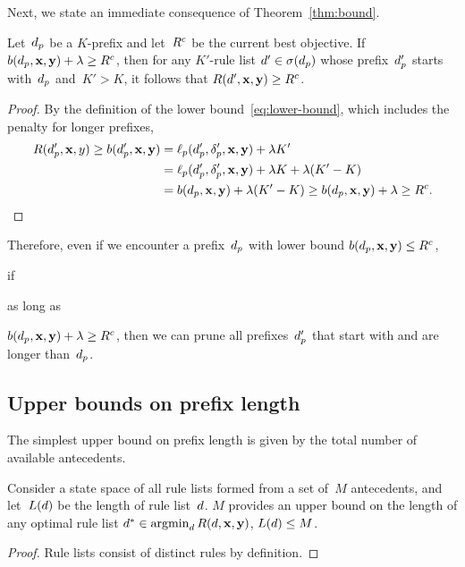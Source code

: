 Next, we state an immediate consequence of Theorem~\ref{thm:bound}.

\begin{lemma}
\label{lemma:lookahead}
Let~$d_p$ be a $K$-prefix
and let~${R^c}$ be the current best objective.
%
If ${b(d_p, \mathbf{x}, \mathbf{y}) + {\lambda} \ge {R^c}}$,
then for any $K'$-rule list ${{d}' \in \sigma(d_p)}$
whose prefix~$d_p'$ starts with~$d_p$ and~${K' > K}$,
it follows that ${R({d}', \mathbf{x}, \mathbf{y}) \ge {R^c}}$.
\end{lemma}

\begin{arxiv}
\begin{proof}
By the definition of the lower bound~\eqref{eq:lower-bound},
which includes the penalty for longer prefixes,
\begin{align}
R(d_p', \mathbf{x}, y) \ge b(d_p', \mathbf{x}, \mathbf{y}) &= \ell_p(d_p', \delta_p', \mathbf{x}, \mathbf{y}) + {\lambda} K' \nonumber \\
&= \ell_p(d_p', \delta_p', \mathbf{x}, \mathbf{y}) + {\lambda} K + {\lambda} (K' - K) \nonumber \\
&= b(d_p, \mathbf{x}, \mathbf{y}) + {\lambda} (K' - K)
\ge b(d_p, \mathbf{x}, \mathbf{y}) + {\lambda} \ge {R^c}.
\label{eq:lookahead}
\end{align}
\end{proof}
\end{arxiv}

Therefore, even if we encounter a prefix~$d_p$
with lower bound ${b(d_p, \mathbf{x}, \mathbf{y}) \le {R^c}}$,
\begin{kdd}
if
\end{kdd}
\begin{arxiv}
as long as
\end{arxiv}
${b(d_p, \mathbf{x}, \mathbf{y}) + {\lambda} \ge {R^c}}$, then we can prune
all prefixes~$d_p'$ that start with and are longer than~$d_p$.

\subsection{Upper bounds on prefix length}
\label{sec:ub-prefix-length}

\begin{arxiv}
The simplest upper bound on prefix length is given by the total
number of available antecedents.

\begin{proposition}
\label{prop:trivial-length}
Consider a state space of all rule lists formed from
a set of~$M$ antecedents,
and let~$L({d})$ be the length of rule list~${d}$.
%
$M$ provides an upper bound on the length of
any optimal rule list
${d^* \in \operatorname*{argmin}_{d} R({d}, \mathbf{x}, \mathbf{y})}$,
\ie ${L({d}) \le M}$.
\end{proposition}

\begin{proof}
Rule lists consist of distinct rules by definition.
\end{proof}
\end{arxiv}

